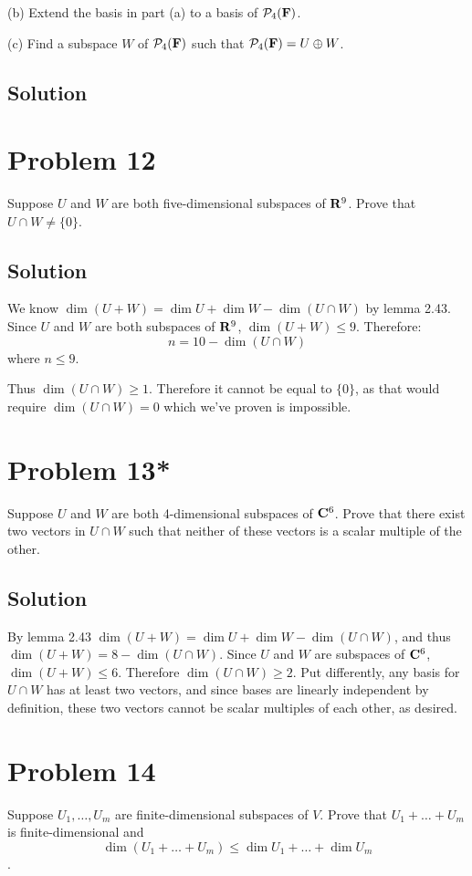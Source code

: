 \documentclass{article}
\begin{document}
\vs

(b) Extend the basis in part (a) to a basis of $\mathcal{P}_4(\mathbf{F})$.

\vs

(c) Find a subspace $W$ of $\mathcal{P}_4(\mathbf{F})$ such that $\mathcal{P}_4(\mathbf{F})=U\oplus W$.

\subsection*{Solution}

\section*{Problem 12}
Suppose $U$ and $W$ are both five-dimensional subspaces of $\mathbf{R}^9$. Prove that $U\cap W\neq\{0\}$.

\subsection*{Solution}
We know $\dim(U+W)=\dim U + \dim W-\dim(U\cap W)$ by lemma 2.43. Since $U$ and $W$ are both subspaces of $\mathbf{R}^9$, $\dim(U+W)\leq 9$. Therefore:
\[n=10-\dim(U\cap W)\]
where $n\leq 9$.

\vs

Thus $\dim(U\cap W)\geq 1$. Therefore it cannot be equal to $\{0\}$, as that would require $\dim(U\cap W) = 0$ which we've proven is impossible.

\section*{Problem 13*}
Suppose $U$ and $W$ are both 4-dimensional subspaces of $\mathbf{C}^6$. Prove that there exist two vectors in $U\cap W$ such that neither of these vectors is a scalar multiple of the other.

\subsection*{Solution}
By lemma 2.43 $\dim(U+W)=\dim U + \dim W - \dim(U\cap W)$, and thus $\dim(U+W)=8 - \dim(U\cap W)$. Since $U$ and $W$ are subspaces of $\mathbf{C}^6$, $\dim(U+W)\leq 6$. Therefore $\dim(U\cap W)\geq 2$. Put differently, any basis for $U\cap W$ has at least two vectors, and since bases are linearly independent by definition, these two vectors cannot be scalar multiples of each other, as desired.

\section*{Problem 14}
Suppose $U_1,\ldots,U_m$ are finite-dimensional subspaces of $V$. Prove that $U_1+\ldots+U_m$ is finite-dimensional and
\[\dim(U_1+\ldots+U_m)\leq\dim U_1+\ldots+\dim U_m\].
\end{document}
